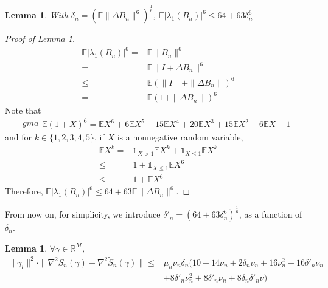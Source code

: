 \documentclass{article} \usepackage{iclr2019_conference,times}
\newtheorem{lemma}[theorem]{Lemma}
\newcommand{\expe}{\mathbb{E}}
\begin{document}
\begin{lemma}
\label{delta_1}
With $\delta_n = (\expe \| \Delta B_n \|^6)^\frac{1}{6}$, $\expe |\lambda_1(B_n)|^6 \leq 64 + 63 \delta_n^6$
\end{lemma}
\begin{proof}[Proof of Lemma \ref{delta_1}]
\begin{equation}
    \begin{split}
        \expe |\lambda_1(B_n)|^6 = & \expe \| B_n \|^6 \\
        = & \expe \| I + \Delta B_n \|^6 \\
        \leq & \expe (\| I \| + \| \Delta B_n \|)^6 \\
        = & \expe (1 + \| \Delta B_n \|)^6
    \end{split}
\end{equation}
Note that
\begin{equation}gma
    \begin{split}
        \expe (1 + X)^6 = \expe X^6 + 6 \expe X^5 + 15 \expe X^4 + 20 \expe X^3 + 15 \expe X^2 + 6 \expe X + 1 
    \end{split}
\end{equation}
and for $k \in \{1, 2, 3, 4, 5\}$, if $X$ is a nonnegative random variable,
\begin{equation}
    \begin{split}
        \expe X^k = & \mathds{1}_{X > 1} \expe X^k + \mathds{1}_{X \leq 1} \expe X^k \\
        \leq & 1 + \mathds{1}_{X \leq 1} \expe X^6 \\
        \leq & 1 + \expe X^6
    \end{split}
\end{equation}
Therefore, $\expe |\lambda_1(B_n)|^6 \leq 64 + 63 \expe \| \Delta B_n \|^6$.
\end{proof}

From now on, for simplicity, we introduce $\delta'_n = (64 + 63 \delta_n^6)^\frac{1}{6}$, as a function of $\delta_n$.


\begin{lemma}
\label{perturbation_hessian_nonasymptotic}
$\forall \gamma \in \mathbb{R}^{M}$,
\begin{equation}
\begin{split}
\| \gamma_l \|^2 \cdot \|\nabla^2 S_n(\gamma) - \nabla^2 \tilde{S}_n(\gamma) \| \leq & \mu_n \nu_n \delta_n (10 + 14 \nu_n + 2 \delta_n \nu_n + 16 \nu_n^2 + 16 \delta'_n \nu_n \\ & + 8 \delta'_n \nu_n^2 + 8 \delta'_n \nu_n + 8 \delta_n \delta'_n \nu)
\end{split}
\end{equation}
\end{lemma}
\end{document}
